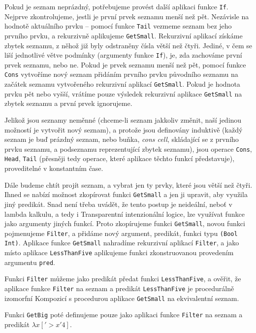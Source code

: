 Pokud je seznam neprázdný, potřebujeme provést další aplikaci funkce \lstinline{If}. Nejprve
zkontrolujeme, jestli je první prvek seznamu menší než pět. Nezávisle na hodnotě aktuálního prvku --
pomocí funkce \lstinline{Tail} vezmeme seznam bez jeho prvního prvku, a rekurzivně aplikujeme
\lstinline{GetSmall}. Rekurzivní aplikací získáme zbytek seznamu, z něhož již byly odstraněny čísla
větší než čtyři. Jediné, v čem se liší jednotlivé větve podmínky (argumenty funkce \lstinline{If}),
je, zda zachováme první prvek seznamu, nebo ne. Pokud je prvek seznamu menší než pět, pomocí funkce
\lstinline{Cons} vytvoříme nový seznam přidáním prvního prvku původního seznamu na začátek seznamu
vytvořeného rekurzivní aplikací \lstinline{GetSmall}. Pokud je hodnota prvku pět nebo vyšší, vrátíme
pouze výsledek rekurzivní aplikace \lstinline{GetSmall} na zbytek seznamu a první prvek ignorujeme.

Jelikož jsou seznamy neměnné (chceme-li seznam jakkoliv změnit, naší jedinou možností je vytvořit
nový seznam), a protože jsou definovány induktivě (každý seznam je buď prázdný seznam, nebo buňka,
\textit{cons cell}, skládající se z prvního prvku seznamu, a podseznamu reprezentující zbytek
seznamu), jsou operace \lstinline{Cons}, \lstinline{Head}, \lstinline{Tail} (přesněji tedy operace,
které aplikace těchto funkcí představuje), proveditelné v konstantním čase.

Dále budeme chtít projít seznam, a vybrat jen ty prvky, které jsou větší než čtyři. Ihned se nabízí
možnost zkopírovat funkci \lstinline{GetSmall} a jen ji upravit, aby využila jiný predikát. Snad
není třeba uvádět, že tento postup je neideální, neboť v lambda kalkulu, a tedy i Transparentní
intenzionální logice, lze využívat funkce jako argumenty jiných funkcí. Proto zkopírujeme funkci
\lstinline{GetSmall}, novou funkci pojmenujeme \lstinline{Filter}, a přidáme nový argument,
predikát, funkci typu \lstinline{(Bool Int)}. Aplikace funkce \lstinline{GetSmall} nahradíme
rekurzivní aplikací \lstinline{Filter}, a jako místo aplikace \lstinline{LessThanFive} aplikujeme
funkci zkonstruovanou provedením argumentu \lstinline{pred}.

Funkci \lstinline{Filter} můžeme jako predikát předat funkci \lstinline{LessThanFive}, a ověřit,
že aplikace funkce \lstinline{Filter} na seznam a predikát \lstinline{LessThanFive} je procedurálně
izomorfní Kompozicí s procedurou aplikace \lstinline{GetSmall} na ekvivalentní seznam.

Funkci \lstinline{GetBig} poté definujeme pouze jako aplikaci funkce \lstinline{Filter} na seznam
a predikát $\lambda x ['> x '4]$.

